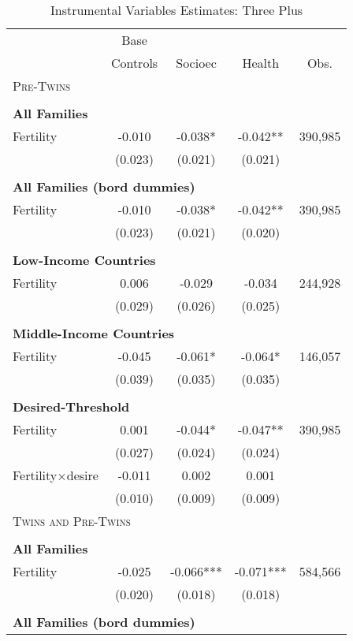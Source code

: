 \begin{table}[!htbp] \centering 
\caption{Instrumental Variables Estimates: Three Plus} 
\label{TWINtab:IVThreeplus} 
\begin{tabular}{lcccc} \toprule \toprule 
&Base&&&\\
&Controls&Socioec&Health&Obs.\\\midrule
\multicolumn{5}{l}{\textsc{Pre-Twins}}\\ 
&&&&\\
\multicolumn{5}{l}{\textbf{All Families}}\\ 
Fertility&-0.010&-0.038*&-0.042**&390,985\\
         &(0.023)&(0.021)&(0.021)&\\
&&&&\\
\multicolumn{5}{l}{\textbf{All Families (bord dummies)}}\\ 
Fertility&-0.010&-0.038*&-0.042**&390,985\\
         &(0.023)&(0.021)&(0.020)&\\
&&&&\\
\multicolumn{5}{l}{\textbf{Low-Income Countries}}\\ 
Fertility&0.006&-0.029&-0.034&244,928\\
         &(0.029)&(0.026)&(0.025)&\\
&&&&\\
\multicolumn{5}{l}{\textbf{Middle-Income Countries}}\\ 
Fertility&-0.045&-0.061*&-0.064*&146,057\\
         &(0.039)&(0.035)&(0.035)&\\
&&&&\\
\multicolumn{5}{l}{\textbf{Desired-Threshold}}\\ 
Fertility&0.001&-0.044*&-0.047**&390,985\\
         &(0.027)&(0.024)&(0.024)&\\
Fertility$\times$desire&-0.011&0.002&0.001&\\
         &(0.010)&(0.009)&(0.009)&\\
\midrule\multicolumn{5}{l}{\textsc{Twins and Pre-Twins}}\\ 
&&&&\\
\multicolumn{5}{l}{\textbf{All Families}}\\ 
Fertility&-0.025&-0.066***&-0.071***&584,566\\
         &(0.020)&(0.018)&(0.018)&\\
&&&&\\
\multicolumn{5}{l}{\textbf{All Families (bord dummies)}}\\ 

\end{tabular}
\end{table}
